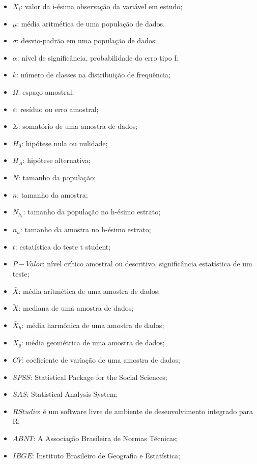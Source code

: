 \begin{refsection}

\begin{itemize}
\item $X_{i}$: valor da i-ésima observação da variável em estudo;
\item $\mu$: média aritmética de uma população de dados.
\item $\sigma$: desvio-padrão em uma população de dados;
\item $\alpha$: nível de significância, probabilidade do erro tipo I;
\item $k$: número de classes na distribuição de frequência;
\item $\Omega$: espaço amostral;
\item $\varepsilon$: resíduo ou erro amostral;
\item $\Sigma$: somatório de uma amostra de dados;
\item $H_{0}$: hipótese nula ou nulidade;
\item $H_{A}$: hipótese alternativa;
\item $N$: tamanho da população; 
\item $n$: tamanho da amostra;
\item $N_{h_{i}}$: tamanho da população no h-ésimo estrato;
\item $n_{h}$: tamanho da amostra no h-ésimo estrato;
\item $t$: estatística do teste t student;
\item $P-Valor$: nível crítico amostral ou descritivo, significância estatística de um teste;
\item $\bar{X}$: média aritmética de uma amostra de dados;
\item $\widetilde{X}$: mediana de uma amostra de dados; 
\item $\bar{X}_{h}$: média harmônica de uma amostra de dados;  
\item $\bar{X}_{g}$: média geométrica de uma amostra de dados;
\item $CV$: coeficiente de variação de uma amostra de dados;
\item $SPSS$: Statistical Package for the Social Sciences;
\item $SAS$: Statistical Analysis System;
\item $RStudio$: é um software livre de ambiente de desenvolvimento integrado para R;
\item $ABNT$: A Associação Brasileira de Normas Técnicas;
\item $IBGE$: Instituto Brasileiro de Geografia e Estatística;

\end{itemize}
\end{refsection}
